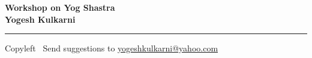 
\graphicspath{{images/}}

\footnotesize


\begin{center}
\Large{\textbf{Workshop on Yog Shastra\\ Yogesh Kulkarni}}  
\end{center}

\begin{multicols}{2}

\end{multicols}

\rule{\linewidth}{0.25pt}
\scriptsize
Copyleft \textcopyleft\  Send suggestions to 
\href{http://www.yogeshkulkarni.com}{yogeshkulkarni@yahoo.com}


